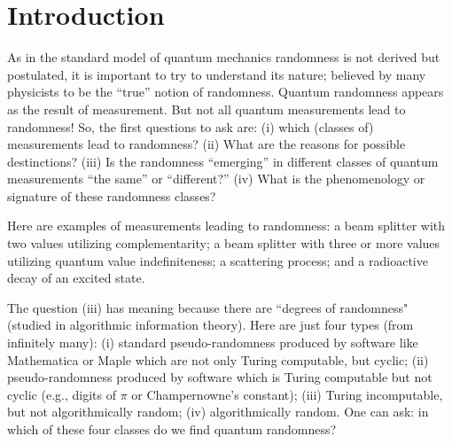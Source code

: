 \documentclass[10pt]{article}%
\begin{document}



\section{Introduction}
\thispagestyle{empty}


As in the standard model of quantum mechanics randomness is not derived but postulated, it is
important to try to understand its nature; believed
by many physicists  to be the ``true'' notion of randomness. Quantum
randomness appears as the result of measurement. But not all quantum
measurements lead to randomness! So, the first questions to ask are:
(i) which (classes of) measurements lead to randomness?
(ii) What are the reasons for possible destinctions?
(iii) Is the randomness ``emerging'' in different classes of quantum measurements ``the same'' or ``different?''
(iv) What is the phenomenology or signature of these randomness classes?

Here are examples of measurements leading to randomness: a beam
splitter with two values utilizing complementarity;
a beam splitter with three or more values utilizing quantum value indefiniteness;
a scattering process; and
a radioactive decay of an excited state.

The question (iii) has meaning because there are ``degrees of randomness"
(studied in algorithmic information theory). Here are just four types
(from infinitely many):
(i) standard pseudo-randomness produced by
software  like Mathematica or Maple  which
are not only Turing computable, but cyclic;
(ii) pseudo-randomness
produced by software which is Turing computable but not cyclic
(e.g., digits of $\pi$ or Champernowne's constant);
(iii) Turing incomputable, but not
algorithmically random;
(iv) algorithmically random. One can ask: in which
of these four classes do we find quantum randomness?
\end{document}
